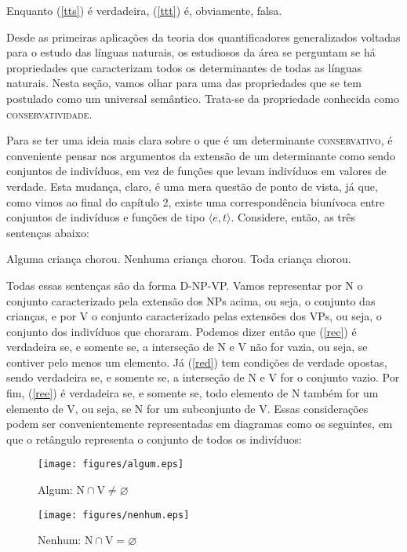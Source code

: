 \n Enquanto (\ref{tts}) é verdadeira, (\ref{ttt}) é, obviamente,
falsa.

Desde as primeiras aplicações da teoria dos quantificadores
generalizados voltadas para o estudo das línguas naturais, os
estudiosos da área se perguntam se há propriedades que
caracterizam todos os determinantes de todas as línguas naturais. Nesta seção, vamos olhar para uma das propriedades que se tem
postulado como um universal semântico. Trata-se da propriedade
conhecida como \textsc{conservatividade}.

Para se ter uma ideia mais clara sobre o que é um determinante
\textsc{conservativo}, é conveniente pensar nos argumentos da
extensão de um determinante como sendo conjuntos de indivíduos, em vez de funções que levam indivíduos em valores de verdade. Esta
mudança, claro, é uma mera questão de ponto de vista, já que, como
vimos ao final do capítulo 2, existe uma correspondência biunívoca
entre conjuntos de indivíduos e funções de tipo $\langle
e,t\rangle$. Considere, então, as três sentenças abaixo:

\begin{exe}
    \ex Alguma criança chorou. \label{rec}
    \ex Nenhuma criança chorou. \label{red}
    \ex Toda criança chorou. \label{ree}
\end{exe}

\n Todas essas sentenças são da forma D-NP-VP. Vamos representar
por N o conjunto caracterizado pela extensão dos NPs acima, ou seja, o conjunto das
crianças, e por V o conjunto caracterizado pelas extensões dos VPs, ou seja, o
conjunto dos indivíduos que choraram. Podemos dizer então que
(\ref{rec}) é verdadeira se, e somente se, a interseção de N e V
não for vazia, ou seja, se contiver pelo menos um elemento. Já
(\ref{red}) tem condições de verdade opostas, sendo verdadeira
se, e somente se, a interseção de N e V for o conjunto vazio. Por
fim, (\ref{ree}) é verdadeira se, e somente se, todo elemento de N
também for um elemento de V, ou seja, se N for um subconjunto de
V. Essas considerações podem ser convenientemente representadas em
diagramas como os seguintes, em que o retângulo representa o conjunto
de todos os indivíduos:

\begin{figure}[H]
\centerline{\texttt{[image: figures/algum.eps]}}
\caption{Algum: $\text{N}\cap\text{V}\neq\varnothing$}
\end{figure}

\begin{figure}[H]
\centerline{\texttt{[image: figures/nenhum.eps]}}
\caption{Nenhum: $\text{N}\cap\text{V}=\varnothing$}
\end{figure}

